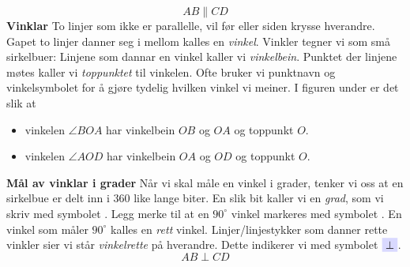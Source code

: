 \[ AB\parallel CD \]
\textbf{Vinklar} \label{vinklar}\os
To linjer som ikke er parallelle, vil før eller siden krysse hverandre. Gapet to linjer danner seg i mellom kalles en \textit{vinkel}. Vinkler tegner vi som små sirkelbuer:
Linjene som dannar en vinkel kaller vi \textit{vinkelbein}. Punktet der linjene møtes kaller vi \textit{toppunktet} til vinkelen. Ofte bruker vi punktnavn og vinkelsymbolet \sym{$ \angle $} for å gjøre tydelig hvilken vinkel vi meiner. I figuren under er det slik at
\begin{itemize}
\item vinkelen $ \angle BOA $  har vinkelbein $ OB $ og $ OA $ og toppunkt $ O $.
\item vinkelen $ \angle AOD $  har vinkelbein $ OA $ og $ OD $ og toppunkt $ O $.	
\end{itemize}
\newpage
\textbf{Mål av vinklar i grader}\os
Når vi skal måle en vinkel i grader, tenker vi oss at en sirkelbue er delt inn i 360 like lange biter. En slik bit kaller vi en \textit{grad}, som vi skriv med symbolet \sym{$ ^\circ $}. 
 \vsk
Legg merke til at en $ 90^\circ $ vinkel markeres med symbolet \sym{$ \square $}. En vinkel som måler $ 90^\circ $ kalles en \textit{rett }vinkel. Linjer/linjestykker som danner rette vinkler sier vi står \textit{vinkelrette} på hverandre. Dette indikerer vi med symbolet $ \sym{$ \perp $} $.
\[ AB\perp CD \]
\newpage
{}\vsk
\label{vinkelend}
\newpage
{}

